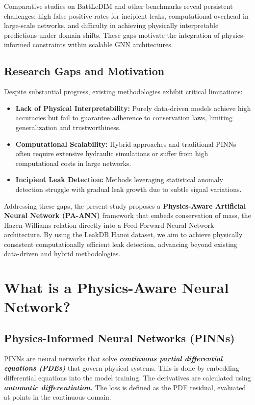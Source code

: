 \documentclass[final,5p,times,twocolumn,authoryear]{elsarticle}
\begin{document}
Comparative studies on BattLeDIM \cite{barros_leak_2025} and other benchmarks reveal persistent challenges: high false positive rates for incipient leaks, computational overhead in large-scale networks, and difficulty in achieving physically interpretable predictions under domain shifts. These gaps motivate the integration of physics-informed constraints within scalable GNN architectures.

\subsection{Research Gaps and Motivation}

Despite substantial progress, existing methodologies exhibit critical limitations:

\begin{itemize}
    \item \textbf{Lack of Physical Interpretability:} Purely data-driven models \cite{MAHDI2024100685, punukollu2023leakdetection} achieve high accuracies but fail to guarantee adherence to conservation laws, limiting generalization and trustworthiness.
    \item \textbf{Computational Scalability:} Hybrid approaches \cite{mazaev2022probabilisticleaklocalization} and traditional PINNs \cite{lin2025digitaltwin} often require extensive hydraulic simulations or suffer from high computational costs in large networks.
    \item \textbf{Incipient Leak Detection:} Methods leveraging statistical anomaly detection \cite{barros_leak_2025, TORNYEVIADZI2023106062} struggle with gradual leak growth due to subtle signal variations.
\end{itemize}

Addressing these gaps, the present study proposes a \textbf{Physics-Aware Artificial Neural Network (PA-ANN)} framework that embeds conservation of mass, the Hazen-Williams relation directly into a Feed-Forward Neural Network architecture. By using the LeakDB Hanoi dataset, we aim to achieve physically consistent computationally efficient leak detection, advancing beyond existing data-driven and hybrid methodologies.

\section{What is a Physics-Aware Neural Network?}

\subsection{Physics-Informed Neural Networks (PINNs)}
PINNs are neural networks that solve \textbf{\textit{continuous partial differential equations (PDEs)}} that govern physical systems. This is done by embedding differential equations into the model training. The derivatives are calculated using \textbf{\textit{automatic differentiation.}} The loss is defined as the PDE residual, evaluated at points in the continuous domain.
\end{document}
